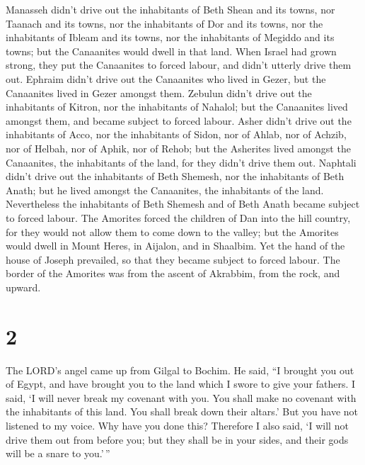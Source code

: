  Manasseh didn't drive out the inhabitants of Beth Shean
and its towns, nor Taanach and its towns, nor the inhabitants of Dor and
its towns, nor the inhabitants of Ibleam and its towns, nor the
inhabitants of Megiddo and its towns; but the Canaanites would dwell in
that land.  When Israel had grown strong, they put the
Canaanites to forced labour, and didn't utterly drive them out.
 Ephraim didn't drive out the Canaanites who lived in
Gezer, but the Canaanites lived in Gezer amongst them. 
Zebulun didn't drive out the inhabitants of Kitron, nor the inhabitants
of Nahalol; but the Canaanites lived amongst them, and became subject to
forced labour.  Asher didn't drive out the inhabitants of
Acco, nor the inhabitants of Sidon, nor of Ahlab, nor of Achzib, nor of
Helbah, nor of Aphik, nor of Rehob;  but the Asherites
lived amongst the Canaanites, the inhabitants of the land, for they
didn't drive them out.  Naphtali didn't drive out the
inhabitants of Beth Shemesh, nor the inhabitants of Beth Anath; but he
lived amongst the Canaanites, the inhabitants of the land. Nevertheless
the inhabitants of Beth Shemesh and of Beth Anath became subject to
forced labour.  The Amorites forced the children of Dan
into the hill country, for they would not allow them to come down to the
valley;  but the Amorites would dwell in Mount Heres, in
Aijalon, and in Shaalbim. Yet the hand of the house of Joseph prevailed,
so that they became subject to forced labour.  The border
of the Amorites was from the ascent of Akrabbim, from the rock, and
upward.

\hypertarget{section-1}{%
\section{2}\label{section-1}}

 The LORD's angel came up from Gilgal to Bochim. He said,
``I brought you out of Egypt, and have brought you to the land which I
swore to give your fathers. I said, `I will never break my covenant with
you.  You shall make no covenant with the inhabitants of
this land. You shall break down their altars.' But you have not listened
to my voice. Why have you done this?  Therefore I also said,
`I will not drive them out from before you; but they shall be in your
sides, and their gods will be a snare to you.'\,''

